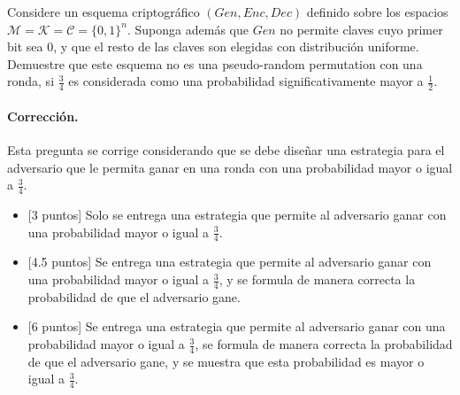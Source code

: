 

Considere un esquema criptográfico $(\textit{Gen}, \textit{Enc}, \textit{Dec})$ definido sobre los espacios $\mathcal{M} = \mathcal{K} = \mathcal{C} = \{0,1\}^n$. Suponga además que $\textit{Gen}$ no permite claves cuyo primer bit sea $0$, y que el resto de las claves son elegidas con distribución uniforme. Demuestre que este esquema no es una pseudo-random permutation con una ronda, si $\frac{3}{4}$ es considerada como una probabilidad significativamente mayor a $\frac{1}{2}$.

\medskip

\paragraph{Corrección.}
Esta pregunta se corrige considerando que se debe diseñar una estrategia para el adversario que le permita ganar en una ronda con una probabilidad mayor o igual a $\frac{3}{4}$.
\begin{itemize}
    \item{[3 puntos]} Solo se entrega una estrategia que permite al adversario ganar con una probabilidad mayor o igual a $\frac{3}{4}$.
    
    \item{[4.5 puntos]} Se entrega una estrategia que permite al adversario ganar con una probabilidad mayor o igual a $\frac{3}{4}$, y se formula de manera correcta la probabilidad de que el adversario gane.

    \item{[6 puntos]} Se entrega una estrategia que permite al adversario ganar con una probabilidad mayor o igual a $\frac{3}{4}$, se formula de manera correcta la probabilidad de que el adversario gane, y se muestra que esta probabilidad es mayor o igual a $\frac{3}{4}$.
\end{itemize}

\medskip










\medskip

